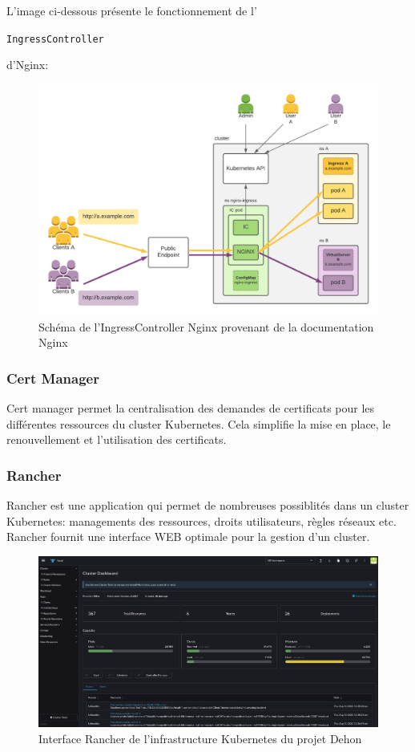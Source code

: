 \documentclass[12pt, a4paper, twoside]{article}
\begin{document}
L'image ci-dessous présente le fonctionnement de l'\begin{code}\texttt{IngressController}\end{code} d'Nginx:

\begin{figure}[!ht]
    \centering
        \includegraphics[width=\textwidth]{src/graph_nginx.png}
    \caption{Schéma de l'IngressController Nginx provenant de la documentation Nginx}
    \label{fig:graph_nginx.png}
\end{figure}

\subsubsection{Cert Manager}
Cert manager permet la centralisation des demandes de certificats pour les différentes ressources du \gls{cluster} \gls{Kubernetes}.
Cela simplifie la mise en place, le renouvellement et l'utilisation des certificats.

\subsubsection{Rancher}
Rancher est une application qui permet de nombreuses possiblités dans un \gls{cluster} \gls{Kubernetes}: managements des ressources, droits utilisateurs, règles réseaux etc. 
Rancher fournit une interface WEB optimale pour la gestion d'un \gls{cluster}.

\begin{figure}[!ht]
    \centering
        \includegraphics[width=\textwidth]{src/interface_rancher.png}
    \caption{Interface Rancher de l'infrastructure \gls{Kubernetes} du projet Dehon}
    \label{fig:rancher_interface}
\end{figure}
\end{document}
